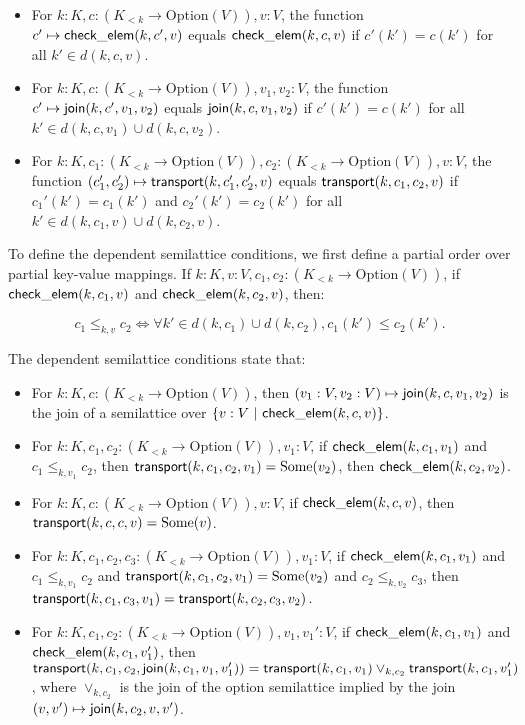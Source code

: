\documentclass{article}
\begin{document}
      \begin{itemize}
        \item For $k : K, c : (K_{<k} \to \mathrm{Option}(V)), v : V$, the function $c' \mapsto \mathsf{check\_elem}(k, c', v)$ equals $\mathsf{check\_elem}(k, c, v)$ if $c'(k') = c(k')$ for all $k' \in d(k, c, v)$.
        \item For $k : K, c : (K_{<k} \to \mathrm{Option}(V)), v_1, v_2 : V$, the function $c' \mapsto \mathsf{join}(k, c', v_1, v_2)$ equals $\mathsf{join}(k, c, v_1, v_2)$ if $c'(k') = c(k')$ for all $k' \in d(k, c, v_1) \cup d(k, c, v_2)$.
        \item For $k : K, c_1 : (K_{<k} \to \mathrm{Option}(V)), c_2 : (K_{<k} \to \mathrm{Option}(V)), v : V$, the function $(c_1', c_2') \mapsto \mathsf{transport}(k, c_1', c_2', v)$ equals $\mathsf{transport}(k, c_1, c_2, v)$ if $c_1'(k') = c_1(k')$ and $c_2'(k') = c_2(k')$ for all $k' \in d(k, c_1, v) \cup d(k, c_2, v)$.
      \end{itemize}

      To define the dependent semilattice conditions, we first define a partial order over partial key-value mappings. If $k : K, v : V, c_1, c_2 : (K_{<k} \to \mathrm{Option}(V))$, if $\mathsf{check\_elem}(k, c_1, v)$ and $\mathsf{check\_elem}(k, c_2, v)$, then:

      $$c_1 \leq_{k, v} c_2 \Leftrightarrow \forall k' \in d(k, c_1) \cup d(k, c_2), c_1(k') \leq c_2(k').$$

      The dependent semilattice conditions state that:

      \begin{itemize}
        \item For $k : K, c : (K_{<k} \to \mathrm{Option}(V))$, then $(v_1 : V, v_2 : V) \mapsto \mathsf{join}(k, c, v_1, v_2)$ is the join of a semilattice over $\{ v : V ~ | ~ \mathsf{check\_elem}(k, c, v) \}$.
        \item For $k : K, c_1, c_2 : (K_{<k} \to \mathrm{Option}(V)), v_1 : V$, if $\mathsf{check\_elem}(k, c_1, v_1)$ and $c_1 \leq_{k, v_1} c_2$, then $\mathsf{transport}(k, c_1, c_2, v_1) = \mathrm{Some}(v_2)$, then $\mathsf{check\_elem}(k, c_2, v_2)$.
        \item For $k : K, c : (K_{<k} \to \mathrm{Option}(V)), v : V$, if $\mathsf{check\_elem}(k, c, v)$, then $\mathsf{transport}(k, c, c, v) = \mathrm{Some}(v)$.
        \item For $k : K, c_1, c_2, c_3 : (K_{<k} \to \mathrm{Option}(V)), v_1 : V$, if $\mathsf{check\_elem}(k, c_1, v_1)$ and $c_1 \leq_{k, v_1} c_2$ and $\mathsf{transport}(k, c_1, c_2, v_1) = \mathrm{Some}(v_2)$ and $c_2 \leq_{k, v_2} c_3$, then $\mathsf{transport}(k, c_1, c_3, v_1) = \mathsf{transport}(k, c_2, c_3, v_2)$.
        \item For $k : K, c_1, c_2 : (K_{<k} \to \mathrm{Option}(V)), v_1, v_1' : V$, if $\mathsf{check\_elem}(k, c_1, v_1)$ and $\mathsf{check\_elem}(k, c_1, v_1')$, then $\mathsf{transport}(k, c_1, c_2, \mathsf{join}(k, c_1, v_1, v_1')) = \mathsf{transport}(k, c_1, v_1) \vee_{k, c_2} \mathsf{transport}(k, c_1, v_1')$, where $\vee_{k, c_2}$ is the join of the option semilattice implied by the join $(v, v') \mapsto \mathsf{join}(k, c_2, v, v')$.
      \end{itemize}
\end{document}
